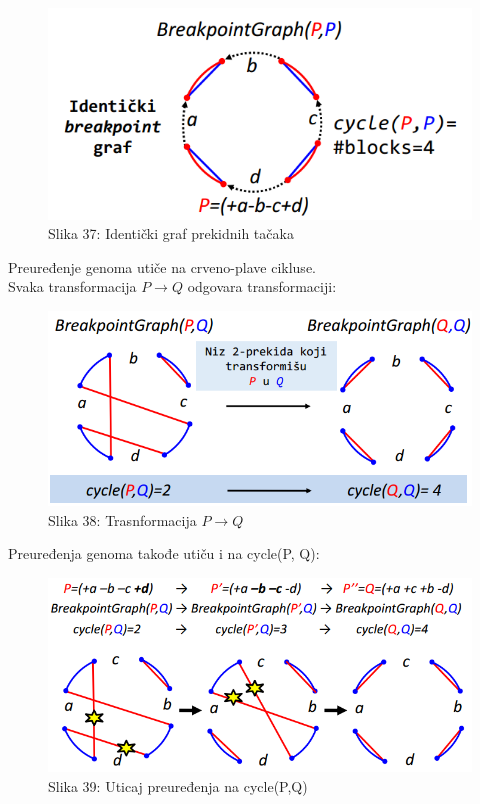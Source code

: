 \documentclass{article}
\begin{document}
\begin{figure}[h!]
\centering
\includegraphics[scale=0.6]{slike/identicki.PNG}
\caption{Slika 37: Identički graf prekidnih tačaka}
\label{slika:X}
\end{figure}
\newpage
Preuređenje genoma utiče na crveno-plave cikluse.\\

Svaka transformacija $P\rightarrow Q$ odgovara transformaciji:

\begin{figure}[h!]
\centering
\includegraphics[scale=0.7]{slike/transfBreakpoint.PNG}
\caption{Slika 38: Trasnformacija $P\rightarrow Q$ }
\label{slika:X}
\end{figure}

\newline Preuređenja genoma takođe utiču i na cycle(P, Q):

\begin{figure}[h!]
\centering
\includegraphics[scale=0.7]{slike/preuredjenja_cycle.PNG}
\caption{Slika 39: Uticaj preuređenja na cycle(P,Q)}
\label{slika:X}
\end{figure}
\end{document}
